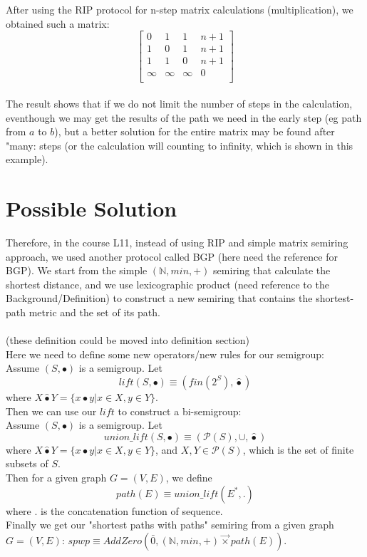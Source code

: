 \documentclass[a4paper,10pt]{article}
\begin{document}
After using the RIP protocol for n-step matrix calculations (multiplication), we obtained such a matrix:
\[
\begin{bmatrix}
    0 & 1 & 1 & n+1 \\
    1 & 0 & 1 & n+1 \\
    1 & 1 & 0 & n+1 \\
    \infty & \infty & \infty & 0 \\
\end{bmatrix}
\]\\
The result shows that if we do not limit the number of steps in the calculation, eventhough we may get the results of the path we need in the early step (eg path from $a$ to $b$), but a better solution for the entire matrix may be found after "many: steps (or the calculation will counting to infinity, which is shown in this example).\\
\section{Possible Solution}
Therefore, in the course L11, instead of using RIP and simple matrix semiring approach, we used another protocol called BGP (here need the reference for BGP). We start from the simple $(\mathbb{N},min,+)$ semiring that calculate the shortest distance, and we use lexicographic product (need reference to the Background/Definition) to construct a new semiring that contains the shortest-path metric and the set of its path.\\\\
(these definition could be moved into definition section)\\
Here we need to define some new operators/new rules for our semigroup:\\
Assume $(S,\bullet)$ is a semigroup. Let
\begin{equation}
  \label{eq:lift:def} 
  lift(S,\bullet)  \equiv (fin(2^S),\hat\bullet)
\end{equation}   
where
$X \hat\bullet Y = \{x\bullet y |x\in X,y\in Y\}$.\\
Then we can use our $lift$ to construct a bi-semigroup:\\
Assume $(S,\bullet)$ is a semigroup. Let
\[
union\_lift(S,\bullet)\equiv (\mathcal{P}(S),\cup,\hat\bullet)
\]
where
$X \hat\bullet Y = \{x\bullet y |x\in X,y\in Y\}$, and $X,Y \in \mathcal{P}(S)$, which is the set of finite subsets of $S$.\\
Then for a given graph $G = (V,E)$, we define
\[
path(E)\equiv union\_lift(E^*,.)
\]
where . is the concatenation function of sequence.\\
Finally we get our "shortest paths with paths" semiring from a given graph $G = (V,E)$: $spwp \equiv AddZero(\bar0,(\mathbb{N},min,+) \overrightarrow{\times} path(E))$.\\
\end{document}
